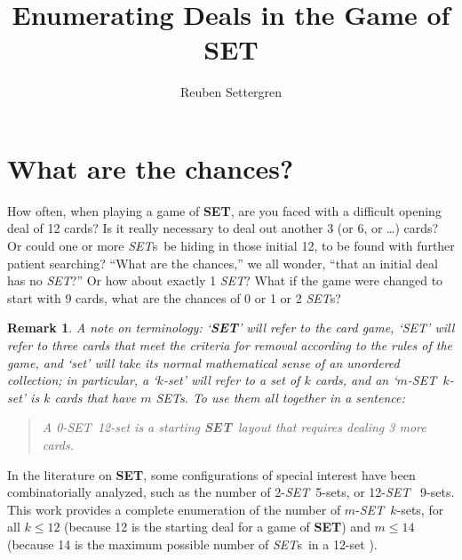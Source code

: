 \documentclass{article}
\newtheorem*{remark}{Remark}
\newcommand{\SET}{{\em SET}}
\newcommand{\SETs}{{\em SET}s}
\newcommand{\SETg}{{\bf SET}}
\begin{document}
\title{Enumerating Deals in the Game of \SETg}
\author{Reuben Settergren}



\maketitle

\section{What are the chances?}
How often, when playing a game of \SETg\texttrademark, are you faced with a
difficult opening deal of 12 cards? Is it really necessary to deal out another 3
(or 6, or \ldots) cards? Or could one or more \SETs~be hiding in those initial
12, to be found with further patient searching?  ``What are the chances,'' we
all wonder, ``that an initial deal has no \SET?'' Or how about exactly 1 \SET?
What if the game were changed to start with 9 cards, what are the chances of 0
or 1 or 2 \SETs?

\begin{remark}
A note on terminology: `\SETg' will refer to the card game, `SET' will refer to
three cards that meet the criteria for removal according to the rules of the
game, and `set' will take its normal mathematical sense of an unordered
collection; in particular, a `$k$-set' will refer to a set of $k$ cards, and an
`$m$-SET~$k$-set' is $k$ cards that have $m$ SETs. To use them all together in
a sentence:
\begin{quote}A 0-\SET~12-set is a starting \SETg~layout that
  requires dealing 3 more cards.
\end{quote}
\end{remark}

In the literature on \SETg, some configurations of special interest have been
combinatorially analyzed, such as the number of 2-\SET~5-sets, or 12-\SET~
9-sets. This work provides a complete enumeration of the number of
$m$-\SET~$k$-sets, for all $k\leq 12$ (because 12 is the starting deal for a
game of \SETg) and $m\leq 14$ (because 14 is the maximum possible number of
\SETs~in a 12-set \cite{VINCI}).
\end{document}
